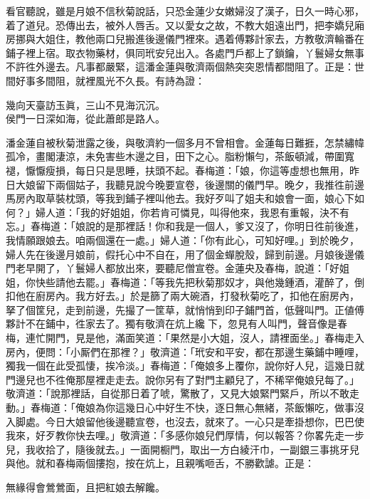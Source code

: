 看官聽說，雖是月娘不信秋菊說話，只恐金蓮少女嫩婦沒了漢子，日久一時心邪，着了道兒。恐傳出去，被外人唇舌。又以愛女之故，不教大姐遠出門，把李嬌兒廂房挪與大姐住，教他兩口兒搬進後邊儀門裡來。遇着傅夥計家去，方教敬濟輪番在鋪子裡上宿。取衣物藥材，俱同玳安兒出入。各處門戶都上了鎖鑰，丫鬟婦女無事不許徃外邊去。凡事都嚴緊，這潘金蓮與敬濟兩個熱突突恩情都間阻了。正是：世間好事多間阻，就裡風光不久長。有詩為證：

\begin{myquote}
幾向天臺訪玉眞，三山不見海沉沉。\\侯門一日深如海，從此蕭郎是路人。
\end{myquote}

潘金蓮自被秋菊泄露之後，與敬濟約一個多月不曾相會。金蓮每日難捱，怎禁繡幃孤冷，畫閣淒涼，未免害些木邊之目，田下之心。脂粉懶勻，茶飯頓減，帶圍寬褪，懨懨瘦損，每日只是思睡，扶頭不起。春梅道：「娘，你這等虛想也無用，昨日大娘留下兩個姑子，我聽見說今晚要宣卷，後邊關的儀門早。晚夕，我推徃前邊馬房內取草裝枕頭，等我到鋪子裡叫他去。我好歹叫了姐夫和娘會一面，娘心下如何？」婦人道：「我的好姐姐，你若肯可憐見，叫得他來，我恩有重報，決不有忘。」{}春梅道：「娘說的是那裡話！你和我是一個人，爹又沒了，你明日徃前後進，我情願跟娘去。咱兩個還在一處。」婦人道：「你有此心，可知好哩。」到於晚夕，婦人先在後邊月娘前，假托心中不自在，用了個金蟬脫殼，歸到前邊。月娘後邊儀門老早開了，丫鬟婦人都放出來，要聽尼僧宣卷。金蓮央及春梅，說道：「好姐姐，你快些請他去罷。」春梅道：「等我先把秋菊那奴才，與他幾鍾酒，灌醉了，倒扣他在廚房內。我方好去。」於是篩了兩大碗酒，打發秋菊吃了，扣他在廚房內，拏了個筐兒，走到前邊，先撮了一筐草，就悄悄到印子鋪門首，低聲叫門。正値傅夥計不在鋪中，徃家去了。獨有敬濟在炕上纔𢱉下，忽見有人叫門，聲音像是春梅，連忙開門，見是他，滿面笑道：「果然是小大姐，沒人，請裡面坐。」春梅走入房內，便問：「小厮們在那裡？」{}敬濟道：「玳安和平安，都在那邊生藥鋪中睡哩，獨我一個在此受孤悽，挨冷淡。」春梅道：「俺娘多上覆你，說你好人兒，這幾日就門邊兒也不徃俺那屋裡走走去。說你另有了對門主顧兒了，不稀罕俺娘兒每了。」敬濟道：「說那裡話，自從那日着了唬，驚散了，又見大娘緊門緊戶，所以不敢走動。」春梅道：「俺娘為你這幾日心中好生不快，逐日無心無緒，茶飯懶吃，做事沒入脚處。今日大娘留他後邊聽宣卷，也沒去，就來了。一心只是牽掛想你，巴巴使我來，好歹教你快去哩。」敬濟道：「多感你娘兒們厚情，何以報答？你畧先走一步兒，我收拾了，隨後就去。」一面開橱門，取出一方白綾汗巾，一副銀三事挑牙兒與他。就和春梅兩個摟抱，按在炕上，且親嘴咂舌，不勝歡謔。正是：

\begin{myquote}
無緣得會鶯鶯面，且把紅娘去解饞。
\end{myquote}

